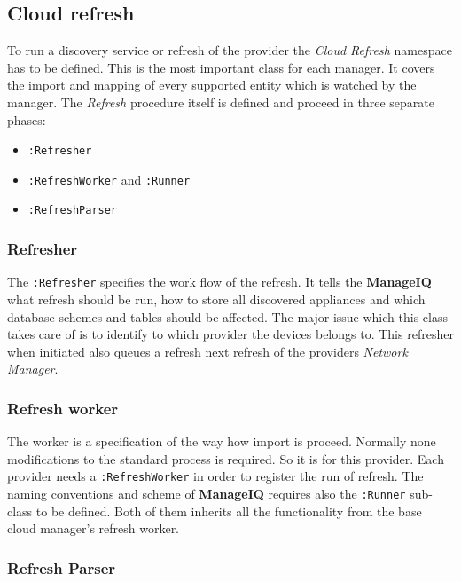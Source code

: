 \subsection{Cloud refresh}
\label{sub:Cloud refresh}

To run a discovery service or refresh of the provider the \emph{Cloud Refresh} namespace has to be defined. This is the most important class for each manager. It covers the import and mapping of every supported entity which is watched by the manager. The \emph{Refresh} procedure itself is defined and proceed in three separate phases:

\begin{itemize}
	\item \texttt{:Refresher}
	\item \texttt{:RefreshWorker} and \texttt{:Runner}
	\item \texttt{:RefreshParser}
\end{itemize}

\subsubsection{Refresher}
\label{subs:Refresher}

The \texttt{:Refresher} specifies the work flow of the refresh. It tells the \textbf{ManageIQ} what refresh should be run, how to store all discovered appliances and which database schemes and tables should be affected. The major issue which this class takes care of is to identify to which provider the devices belongs to. This refresher when initiated also queues a refresh next refresh of the providers \emph{Network Manager}.

\subsubsection{Refresh worker}
\label{subs:Refresh worker}

The worker is a specification of the way how import is proceed. Normally none modifications to the standard process is required. So it is for this provider. Each provider needs a \texttt{:RefreshWorker} in order to register the run of refresh. The naming conventions and scheme of \textbf{ManageIQ} requires also the \texttt{:Runner} sub-class to be defined. Both of them inherits all the functionality from the base cloud manager's refresh worker.

\subsubsection{Refresh Parser}
\label{subs:Refresh Parser}

